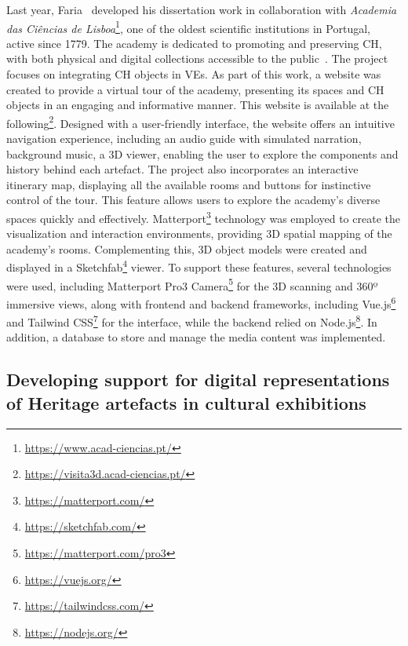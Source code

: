 Last year, Faria~\cite{tese_tourFaria2024} developed his dissertation work in collaboration with \textit{Academia das Ciências de Lisboa}\footnote{\url{https://www.acad-ciencias.pt/}}, one of the oldest scientific institutions in Portugal, active since 1779.
The academy is dedicated to promoting and preserving \gls{CH}, with both physical and digital collections accessible to the public~\cite{academiaCiencias2024}.
The project focuses on integrating \gls{CH} objects in \glspl{VE}. As part of this work, a website was created to provide a virtual tour of the academy, presenting its spaces and \gls{CH} objects in an engaging and informative manner.
This website is available at the following\footnote{\url{https://visita3d.acad-ciencias.pt/}}.
Designed with a user-friendly interface, the website offers an intuitive navigation experience, including an audio guide with simulated narration, background music, a \gls{3D} viewer, enabling the user to explore the components and history behind each artefact.
The project also incorporates an interactive itinerary map, displaying all the available rooms and buttons for instinctive control of the tour. This feature allows users to explore the academy's diverse spaces quickly and effectively.
Matterport\footnote{\url{https://matterport.com/}} technology was employed to create the visualization and interaction environments, providing \gls{3D} spatial mapping of the academy's rooms. Complementing this, \gls{3D} object models were created and displayed in a Sketchfab\footnote{\url{https://sketchfab.com/}} viewer. 
To support these features, several technologies were used, including Matterport Pro3 Camera\footnote{\url{https://matterport.com/pro3}} for the \gls{3D} scanning and 360º immersive views, along with frontend and backend frameworks, including Vue.js\footnote{\url{https://vuejs.org/}} and Tailwind CSS\footnote{\url{https://tailwindcss.com/}} for the interface, 
while the backend relied on Node.js\footnote{\url{https://nodejs.org/}}. In addition, a database to store and manage the media content was implemented.

\subsection{Developing support for digital representations of Heritage artefacts in cultural exhibitions}
\label{sec:marcia_thesis}

